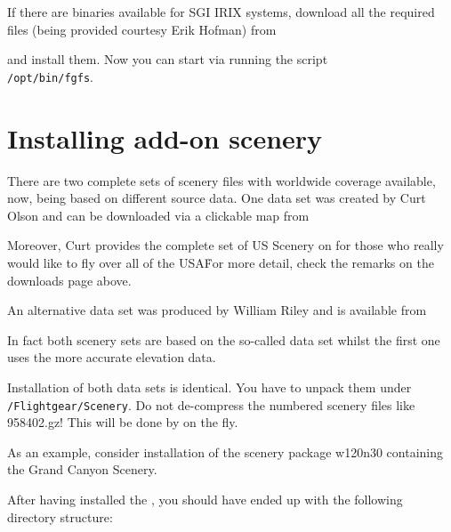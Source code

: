 If there are binaries available for SGI IRIX systems, download all the required files (being provided courtesy Erik Hofman)
from
 \medskip

 \medskip

 \noindent
 and install them. Now you can start \FlightGear{} via running the script\\
\texttt{/opt/bin/fgfs}.

\section{Installing add-on scenery}

There are two complete sets of scenery files with worldwide coverage available, now, being based on different source data. One data set was created by Curt Olson and can be downloaded via a clickable map from
 \medskip

 \medskip

 \noindent
Moreover, Curt provides the complete set of US Scenery on  for those who
really would like to fly over all of the USA\. For more detail, check the remarks on the
downloads page above.

An alternative data set was produced by William Riley and is available from
\medskip

 \medskip

In fact both scenery sets are based on the so-called  data
set whilst the first one uses the more accurate  elevation
data.

Installation of both data sets is identical. You have to unpack them
under \texttt{/Flightgear/Scenery}. Do not de-compress the numbered
scenery files like 958402.gz! This will be done by \FlightGear{} on the
fly.

As an example, consider installation of the scenery package w120n30 containing the Grand
Canyon Scenery.

After having installed the , you should have ended up with the
following directory structure:
\medskip

